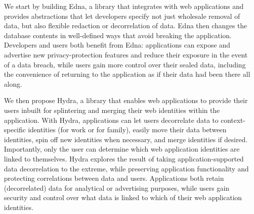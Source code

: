 We start by building Edna, a library that integrates with web applications and
provides abstractions that let developers specify not just wholesale removal of
data, but also flexible redaction or decorrelation of data. Edna then changes
the database contents in well-defined ways that avoid breaking the application.
Developers and users both benefit from Edna: applications can expose and
advertise new privacy-protection features and reduce their exposure in the event
of a data breach, while users gain more control over their sealed data,
including the convenience of returning to the application as if their data had
been there all along.

We then propose Hydra, a library that enables web applications to provide their
users inbuilt for splintering and merging their web identities within the
application. With Hydra, applications can let users decorrelate data to
context-specific identities (\eg for work or for family), easily
move their data between identities, spin off new identities when necessary, and
merge identities if desired. Importantly, only the user can determine which
web application identities are linked to themselves.
%
Hydra explores the result of taking application-supported data
decorrelation to the extreme, while preserving application functionality and
protecting correlations between data and users. Applications both retain
(decorrelated) data for \eg analytical or advertising purposes, while users gain
security and control over what data is linked to which of their web application
identities.

\begin{comment}
\section{Related Work}
\label{sec:intro:related}

\section{Approach}
\label{sec:intro:approach}


\section{Contributions}
\label{sec:intro:contributions}


\section{Reading Guide}
\label{sec:intro:reading-guide}
\end{comment}
